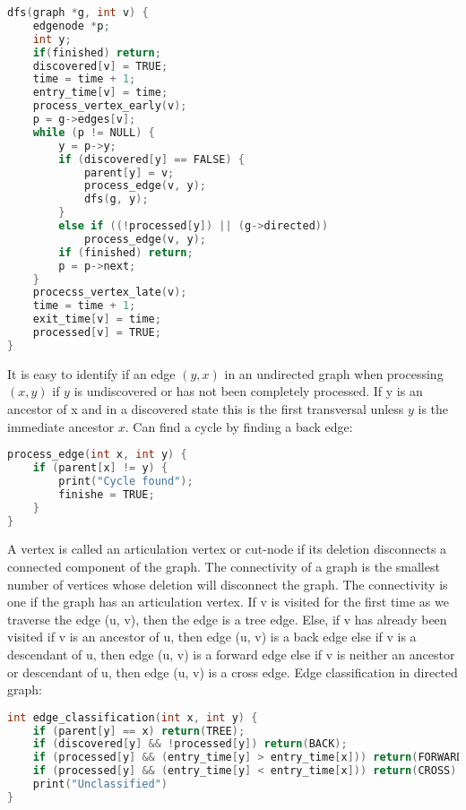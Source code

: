\documentclass[10pt]{article}
\theoremstyle{definition}
\begin{document}
\begin{lstlisting}[language=C]
dfs(graph *g, int v) {
    edgenode *p;
    int y;
    if(finished) return;
    discovered[v] = TRUE;
    time = time + 1;
    entry_time[v] = time;
    process_vertex_early(v);
    p = g->edges[v];
    while (p != NULL) {
        y = p->y;
        if (discovered[y] == FALSE) {
            parent[y] = v;
            process_edge(v, y);
            dfs(g, y);
        }
        else if ((!processed[y]) || (g->directed))
            process_edge(v, y);
        if (finished) return;
        p = p->next;
    }
    procecss_vertex_late(v);
    time = time + 1;
    exit_time[v] = time;
    processed[v] = TRUE;
}
\end{lstlisting}
It is easy to identify if an edge $(y, x)$ in an undirected graph when processing $(x, y)$ if $y$ is undiscovered or has not been completely processed. If y is an ancestor of x and in a discovered state this is the first transversal unless $y$ is the immediate ancestor $x$. Can find a cycle by finding a back edge:

\begin{lstlisting}[language=C]
process_edge(int x, int y) {
    if (parent[x] != y) {
        print("Cycle found");
        finishe = TRUE;
    }
}
\end{lstlisting}
A vertex is called an articulation vertex or cut-node if its deletion disconnects a connected component of the graph. The connectivity of a graph is the smallest number of vertices whose deletion will disconnect the graph. The connectivity is one if the graph has an articulation vertex. If v is visited for the first time as we traverse the edge (u, v), then the edge is a tree edge. Else, if v has already been visited if v is an ancestor of u, then edge (u, v) is a back edge else if v is a descendant of u, then edge (u, v) is a forward edge else if v is neither an ancestor or descendant of u, then edge (u, v) is a cross edge. Edge classification in directed graph:

\begin{lstlisting}[language=C]
int edge_classification(int x, int y) {
    if (parent[y] == x) return(TREE);
    if (discovered[y] && !processed[y]) return(BACK);
    if (processed[y] && (entry_time[y] > entry_time[x])) return(FORWARD);
    if (processed[y] && (entry_time[y] < entry_time[x])) return(CROSS);
    print("Unclassified")
}
\end{lstlisting}
\end{document}
